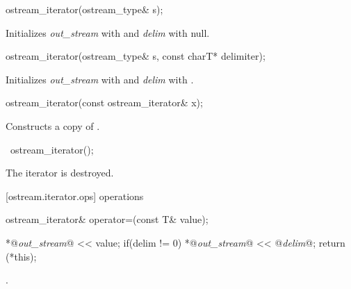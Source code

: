 %
\begin{itemdecl}
ostream_iterator(ostream_type& s);
\end{itemdecl}

\begin{itemdescr}
\pnum
\effects
Initializes \textit{out_stream} with  and \textit{delim} with null.
\end{itemdescr}


%
\begin{itemdecl}
ostream_iterator(ostream_type& s, const charT* delimiter);
\end{itemdecl}

\begin{itemdescr}
\pnum
\effects
Initializes \textit{out_stream} with  and \textit{delim} with .
\end{itemdescr}


%
\begin{itemdecl}
ostream_iterator(const ostream_iterator& x);
\end{itemdecl}

\begin{itemdescr}
\pnum
\effects
Constructs a copy of .
\end{itemdescr}

%
\begin{itemdecl}
~ostream_iterator();
\end{itemdecl}

\begin{itemdescr}
\pnum
\effects
The iterator is destroyed.
\end{itemdescr}

[ostream.iterator.ops]{ operations}

%
%
\begin{itemdecl}
ostream_iterator& operator=(const T& value);
\end{itemdecl}

\begin{itemdescr}
\pnum
\effects
\begin{codeblock}
*@\textit{out_stream}@ << value;
if(delim != 0)
  *@\textit{out_stream}@ << @\textit{delim}@;
return (*this);
\end{codeblock}

\begin{addedblock}
\pnum
\requires {}.
\end{addedblock}
\end{itemdescr}

